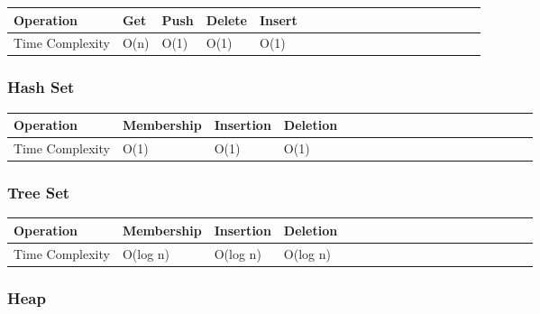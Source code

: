 \documentclass[11pt,oneside]{book}
\begin{document}
\begin{center}\begin{tabulary}{0.4\linewidth}{|l|l|l|l|l|l|l|l|l|l|l|l|l|l|l|l|l|l|l}\hline


  Operation &
  Get &
  Push &
  Delete &
  Insert\\
\hline


  Time Complexity &
  O(n) &
  O(1) &
  O(1) &
  O(1)\\

\hline\end{tabulary}\end{center}

\subsubsection{Hash Set}

\begin{center}\begin{tabulary}{0.4\linewidth}{|l|l|l|l|l|l|l|l|l|l|l|l|l|l|l|l|l|l|l}\hline


  Operation &
  Membership &
  Insertion &
  Deletion\\
\hline


  Time Complexity &
  O(1) &
  O(1) &
  O(1)\\

\hline\end{tabulary}\end{center}

\subsubsection{Tree Set}

\begin{center}\begin{tabulary}{0.4\linewidth}{|l|l|l|l|l|l|l|l|l|l|l|l|l|l|l|l|l|l|l}\hline


  Operation &
  Membership &
  Insertion &
  Deletion\\
\hline


  Time Complexity &
  O(log n) &
  O(log n) &
  O(log n)\\

\hline\end{tabulary}\end{center}

\subsubsection{Heap}
\end{document}
